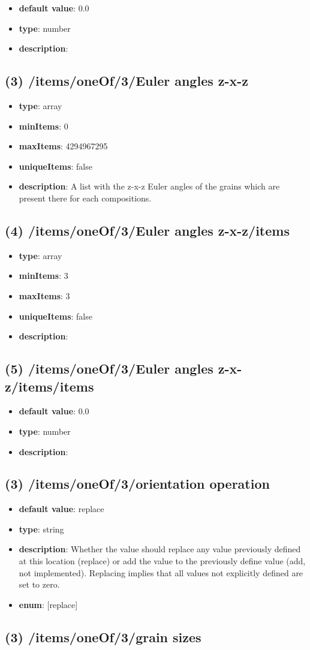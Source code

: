 \begin{itemize}[leftmargin=6em]\item {\bf default value}: 0.0
\item {\bf type}: number
\item {\bf description}: 
\end{itemize}\subsection{(3) /items/oneOf/3/Euler angles z-x-z}
\begin{itemize}[leftmargin=3em]\item {\bf type}: array
\item {\bf minItems}: 0
\item {\bf maxItems}: 4294967295
\item {\bf uniqueItems}: false
\item {\bf description}: A list with the z-x-z Euler angles of the grains which are present there for each compositions.
\end{itemize}\subsection{(4) /items/oneOf/3/Euler angles z-x-z/items}
\begin{itemize}[leftmargin=4em]\item {\bf type}: array
\item {\bf minItems}: 3
\item {\bf maxItems}: 3
\item {\bf uniqueItems}: false
\item {\bf description}: 
\end{itemize}\subsection{(5) /items/oneOf/3/Euler angles z-x-z/items/items}
\begin{itemize}[leftmargin=5em]\item {\bf default value}: 0.0
\item {\bf type}: number
\item {\bf description}: 
\end{itemize}\subsection{(3) /items/oneOf/3/orientation operation}
\begin{itemize}[leftmargin=3em]\item {\bf default value}: replace
\item {\bf type}: string
\item {\bf description}: Whether the value should replace any value previously defined at this location (replace) or add the value to the previously define value (add, not implemented). Replacing implies that all values not explicitly defined are set to zero.
\item {\bf enum}: [replace]\end{itemize}\subsection{(3) /items/oneOf/3/grain sizes}
